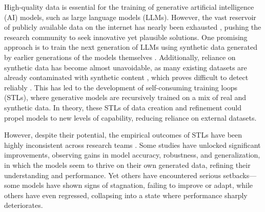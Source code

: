 
High-quality data is essential for the training of generative artificial intelligence (AI) models, such as large language models (LLMs). However, the vast reservoir of publicly available data on the internet has nearly been exhausted \citep{villalobos2022will}, pushing the research community to seek innovative yet plausible solutions. One promising approach is to train the next generation of LLMs using synthetic data generated by earlier generations of the models themselves \citep{briesch2023large}. Additionally, reliance on synthetic data has become almost unavoidable, as many existing datasets are already contaminated with synthetic content \citep{schuhmann2022laion}, which proves difficult to detect reliably \citep{sadasivan2023can}. This has led to the development of self-consuming training loops (STLs), where generative models are recursively trained on a mix of real and synthetic data. In theory, these STLs of data creation and refinement could propel models to new levels of capability, reducing reliance on external datasets.

However, despite their potential, the empirical outcomes of STLs have been highly inconsistent across research teams \citep{shumailov2024ai,alemohammadself,bertrandstability}. Some studies \citep{gerstgrasser2024is, bertrandstability, gillmanself} have unlocked significant improvements, observing gains in model accuracy, robustness, and generalization, in which the models seem to thrive on their own generated data, refining their understanding and performance. Yet others \citep{shumailov2024ai,alemohammadself} have encountered serious setbacks—some models have shown signs of stagnation, failing to improve or adapt, while others have even regressed, collapsing into a state where performance sharply deteriorates.

